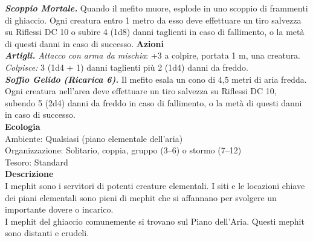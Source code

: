 \begin{multicols}{2}
\emph{\textbf{Scoppio Mortale.}} Quando il mefito muore, esplode in uno scoppio di frammenti di ghiaccio. Ogni creatura entro 1 metro da esso deve effettuare un tiro salvezza su Riflessi DC 10 o subire 4 (1d8) danni taglienti in caso di fallimento, o la metà di questi danni in caso di successo.
\smallskip\textbf{Azioni}\\
\emph{\textbf{Artigli.} Attacco con arma da mischia}: +3 a colpire, portata 1 m, una creatura.\\
\emph{Colpisce:} 3 (1d4 + 1) danni taglienti più 2 (1d4) danni da freddo.\\
\emph{\textbf{Soffio Gelido (Ricarica 6).}} Il mefito esala un cono di 4,5 metri di aria fredda. Ogni creatura nell'area deve effettuare un tiro salvezza su Riflessi DC 10, subendo 5 (2d4) danni da freddo in caso di fallimento, o la metà di questi danni in caso di successo.\\
\textbf{Ecologia}\\
Ambiente: Qualsiasi (piano elementale dell'aria)\\
Organizzazione: Solitario, coppia, gruppo (3–6) o stormo (7–12)\\
Tesoro: Standard\\
\textbf{Descrizione}\\
I mephit sono i servitori di potenti creature elementali. I siti e le locazioni chiave dei piani elementali sono pieni di mephit che si affannano per svolgere un importante dovere o incarico.\\

I mephit del ghiaccio comunemente si trovano sul Piano dell’Aria. Questi mephit sono distanti e crudeli.\\


\end{multicols}
